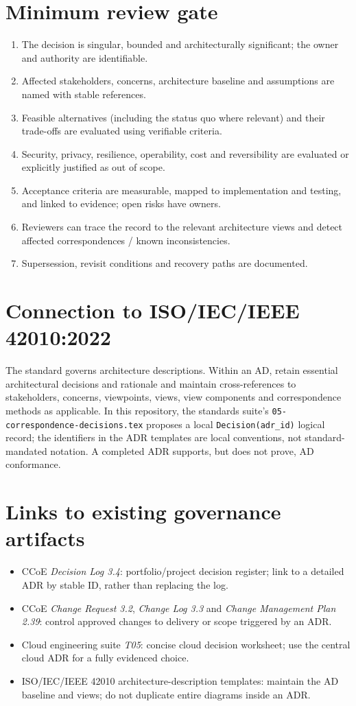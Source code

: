 \documentclass[11pt,letterpaper]{article}
\begin{document}
\section{Minimum review gate}
\begin{enumerate}
\item The decision is singular, bounded and architecturally significant;
the owner and authority are identifiable.
\item Affected stakeholders, concerns, architecture baseline and assumptions
are named with stable references.
\item Feasible alternatives (including the status quo where relevant)
and their trade-offs are evaluated using verifiable criteria.
\item Security, privacy, resilience, operability, cost and reversibility
are evaluated or explicitly justified as out of scope.
\item Acceptance criteria are measurable, mapped to implementation and
testing, and linked to evidence; open risks have owners.
\item Reviewers can trace the record to the relevant architecture views
and detect affected correspondences / known inconsistencies.
\item Supersession, revisit conditions and recovery paths are documented.
\end{enumerate}

\section{Connection to ISO/IEC/IEEE 42010:2022}
The standard governs architecture descriptions. Within an AD, retain
essential architectural decisions and rationale and maintain
cross-references to stakeholders, concerns, viewpoints, views,
view components and correspondence methods as applicable.
In this repository, the standards suite's
\texttt{05-correspondence-decisions.tex} proposes a local
\texttt{Decision(adr\_id)} logical record; the identifiers in the ADR
templates are local conventions, not standard-mandated notation.
A completed ADR supports, but does not prove, AD conformance.

\section{Links to existing governance artifacts}
\begin{itemize}
\item CCoE \emph{Decision Log 3.4}: portfolio/project decision register;
link to a detailed ADR by stable ID, rather than replacing the log.
\item CCoE \emph{Change Request 3.2}, \emph{Change Log 3.3} and
\emph{Change Management Plan 2.39}: control approved changes to delivery
or scope triggered by an ADR.
\item Cloud engineering suite \emph{T05}: concise cloud
decision worksheet; use the central cloud ADR for a fully evidenced choice.
\item ISO/IEC/IEEE 42010 architecture-description templates: maintain
the AD baseline and views; do not duplicate entire diagrams inside an ADR.
\end{itemize}
\end{document}
